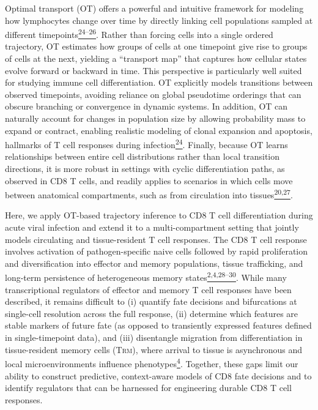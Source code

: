 Optimal transport (OT) offers a powerful and intuitive framework for
modeling how lymphocytes change over time by directly linking cell
populations sampled at different
timepoints\href{https://sciwheel.com/work/citation?ids=6347423,15548348,17428135\&pre=\&pre=\&pre=\&suf=\&suf=\&suf=\&sa=0,0,0\&dbf=0\&dbf=0\&dbf=0}{\textsuperscript{24--26}}.
Rather than forcing cells into a single ordered trajectory, OT estimates
how groups of cells at one timepoint give rise to groups of cells at the
next, yielding a ``transport map'' that captures how cellular states
evolve forward or backward in time. This perspective is particularly
well suited for studying immune cell differentiation. OT explicitly
models transitions between observed timepoints, avoiding reliance on
global pseudotime orderings that can obscure branching or convergence in
dynamic systems. In addition, OT can naturally account for changes in
population size by allowing probability mass to expand or contract,
enabling realistic modeling of clonal expansion and apoptosis, hallmarks
of T cell responses during
infection\href{https://sciwheel.com/work/citation?ids=6347423\&pre=\&suf=\&sa=0\&dbf=0}{\textsuperscript{24}}.
Finally, because OT learns relationships between entire cell
distributions rather than local transition directions, it is more robust
in settings with cyclic differentiation paths, as observed in CD8 T
cells, and readily applies to scenarios in which cells move between
anatomical compartments, such as from circulation into
tissues\href{https://sciwheel.com/work/citation?ids=14086393,13729536\&pre=\&pre=\&suf=\&suf=\&sa=0,0\&dbf=0\&dbf=0}{\textsuperscript{20,27}}.

Here, we apply OT-based trajectory inference to CD8 T cell
differentiation during acute viral infection and extend it to a
multi-compartment setting that jointly models circulating and
tissue-resident T cell responses. The CD8 T cell response involves
activation of pathogen-specific naive cells followed by rapid
proliferation and diversification into effector and memory populations,
tissue trafficking, and long-term persistence of heterogeneous memory
states\href{https://sciwheel.com/work/citation?ids=100389,17425314,15592036,14778778,1124271\&pre=\&pre=\&pre=\&pre=\&pre=\&suf=\&suf=\&suf=\&suf=\&suf=\&sa=0,0,0,0,0\&dbf=0\&dbf=0\&dbf=0\&dbf=0\&dbf=0}{\textsuperscript{2,4,28--30}}.
While many transcriptional regulators of effector and memory T cell
responses have been described, it remains difficult to (i) quantify fate
decisions and bifurcations at single-cell resolution across the full
response, (ii) determine which features are stable markers of future
fate (as opposed to transiently expressed features defined in
single-timepoint data), and (iii) disentangle migration from
differentiation in tissue-resident memory cells (T\textsc{rm}), where
arrival to tissue is asynchronous and local microenvironments influence
phenotypes\href{https://sciwheel.com/work/citation?ids=100389\&pre=\&suf=\&sa=0\&dbf=0}{\textsuperscript{4}}.
Together, these gaps limit our ability to construct predictive,
context-aware models of CD8 fate decisions and to identify regulators
that can be harnessed for engineering durable CD8 T cell responses.

